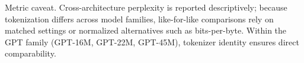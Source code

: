 \documentclass[11pt]{article}
\begin{document}
Metric caveat. Cross-architecture perplexity is reported descriptively; because tokenization differs across model families, like-for-like comparisons rely on matched settings or normalized alternatives such as bits-per-byte.
Within the GPT family (GPT-16M, GPT-22M, GPT-45M), tokenizer identity ensures direct comparability.
\end{document}
